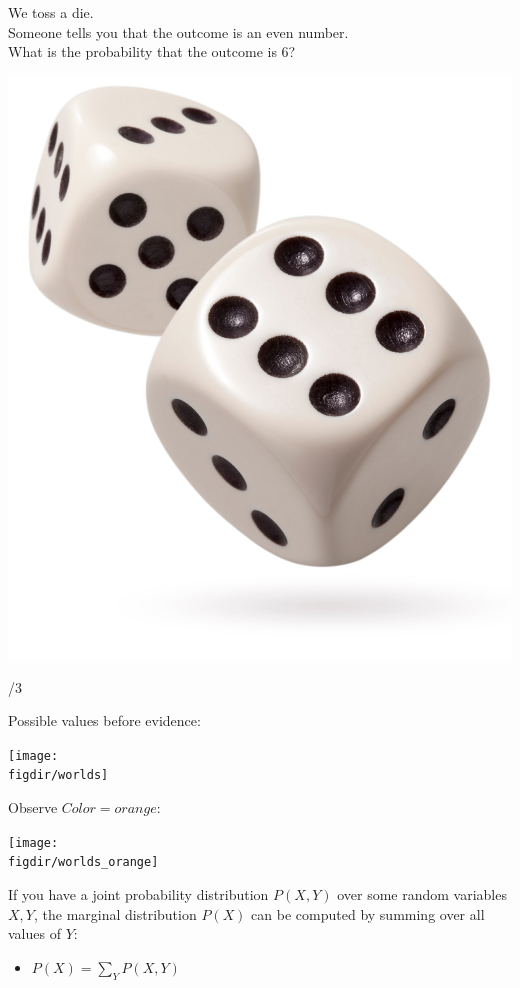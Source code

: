 \documentclass[12pt]{beamer} %
\newcommand{\figdir}{../../figures/ch06}
\begin{document}
\begin{slide}

We toss a die.\\
Someone tells you that the outcome is an even number.\\
What is the probability that the outcome is 6?
\begin{center}
\includegraphics[width=0.4\columnwidth]{figures/uncert_fig_dice1.jpg}
\end{center}
/3
\end{slide}


\begin{slide}
Possible values before evidence:
\begin{center}
\texttt{[image: \\figdir/worlds]}
\end{center}
\pause
Observe $Color=orange$:
\begin{center}
\texttt{[image: \\figdir/worlds\_orange]}
\end{center}
\end{slide}


\begin{slide}

If you have a joint probability distribution $P(X,Y)$ over some random variables $X,Y$,
the marginal distribution $P(X)$ can be computed by summing over all values of $Y$:

\begin{itemize}
\item $P(X) = \sum_Y P(X,Y)$
\end{itemize}

\end{slide}
\end{document}
